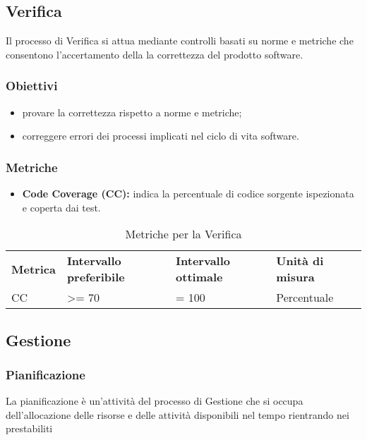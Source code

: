 \subsection{Verifica}
Il processo di Verifica si attua mediante controlli basati su norme e metriche che consentono l'accertamento della la correttezza del prodotto software.
\subsubsection{Obiettivi}
\begin{itemize}
	\item provare la correttezza rispetto a norme e metriche;
	\item correggere errori dei processi implicati nel ciclo di vita software.
\end{itemize}
\subsubsection{Metriche}
\begin{itemize}
	\item \textbf{Code Coverage (CC):} indica la percentuale di codice sorgente ispezionata e coperta dai test.
\end{itemize}

\renewcommand{\arraystretch}{2.2}
\begin{longtable}{|C{2.5cm}|C{3.25cm}|C{3.25cm}|C{3cm}|}
	
	\caption{Metriche per la Verifica}\\
	\hline
	
	\textbf{Metrica} & \textbf{Intervallo preferibile}  & \textbf{Intervallo ottimale} & \textbf{Unità di misura}
	\tabularnewline
	\endfirsthead
	
	CC & >= 70  & = 100 & Percentuale \\ 
	
\end{longtable}


\subsection{Gestione}
\subsubsection{Pianificazione}
La pianificazione è un'attività del processo di Gestione che si occupa dell'allocazione delle risorse e delle attività disponibili nel tempo rientrando nei prestabiliti
